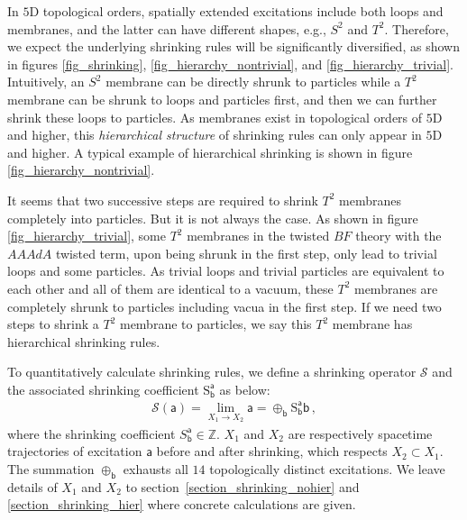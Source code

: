 \documentclass[11pt,nofootinbib,preprint]{revtex4-1}
\def\Z{\mathbb{Z}}
\begin{document}
In $5$D topological orders, spatially extended excitations include both loops and membranes, and the latter can have different shapes, e.g., $S^2$ and $T^2$. Therefore, we expect the underlying shrinking rules will be significantly diversified, as shown in figures \ref{fig_shrinking}, \ref{fig_hierarchy_nontrivial},  and \ref{fig_hierarchy_trivial}. Intuitively,  an $S^2$ membrane can be directly shrunk to particles while a $T^2$ membrane can be shrunk to loops and particles first, and then we can further  shrink these loops to particles. As membranes exist in topological orders of $5$D and higher, this \textit{hierarchical structure} of shrinking rules can only appear in $5$D and higher. A typical example of hierarchical shrinking is shown in figure \ref{fig_hierarchy_nontrivial}. 

It seems that   two successive steps are required to shrink $T^2$ membranes completely into particles. But it is not always the case. As shown in figure \ref{fig_hierarchy_trivial}, some $T^2$ membranes in the twisted $BF$ theory with the $AAAdA$ twisted term, upon being shrunk in the first step, only lead to trivial loops and some particles. As trivial loops and trivial particles are equivalent to each other and all of them are identical to a vacuum, these $T^2$ membranes are completely shrunk to particles including vacua in the first step. If we need two steps to shrink a $T^2$ membrane to particles, we say this $T^2$ membrane has hierarchical shrinking rules. 
 
 
 
To quantitatively calculate shrinking rules, we  define a shrinking operator $\mathcal{S}$ and the associated shrinking coefficient $\mathrm{S}_{\mathsf{b}}^{\mathsf{a}}$ as below:
\begin{align}
\mathcal{S}\left(\mathsf{a}\right)=\underset{X_{1}\rightarrow X_{2}}{\lim}\mathsf{a}=\oplus_{\mathsf{b}} \mathrm{S}^{\mathsf{a}}_{\mathsf{b}} \mathsf{b}\,,
\end{align}
where the shrinking coefficient $S^{\mathsf{a}}_{\mathsf{b}}\in\Z$. $X_1$ and $X_2$ are respectively  spacetime trajectories of excitation $\mathsf{a}$ before and after shrinking, which respects $X_2\subset X_1$.   The summation   $\oplus_{\mathsf{b}}$ exhausts all $14$ topologically distinct excitations.  We leave details of $X_1$ and $X_2$ to section~\ref{section_shrinking_nohier} and \ref{section_shrinking_hier} where concrete calculations are given.  
 
\end{document}
